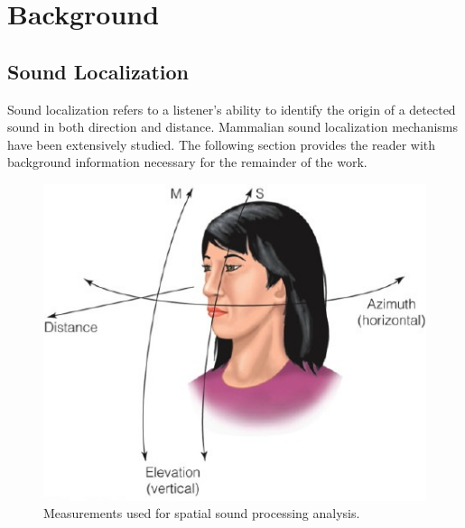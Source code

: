 \newpage                                                   \chapter{Background}


\section{                  Sound Localization                                 }


Sound localization refers to a listener's ability to identify the origin of a
detected sound in both direction and distance.  Mammalian sound localization
mechanisms have been extensively studied. The following section provides the
reader with background information necessary for the remainder of the work.

\begin{figure}[htbp]
\centering
  \begin{minipage}[b]{.6\linewidth}
    \centering
  \includegraphics[width=1\linewidth]{images/binaural_reference.jpg}
    \caption{Measurements used for spatial sound processing analysis.}
    \label{fig:binaural_measurements}
  \end{minipage}
\end{figure}


